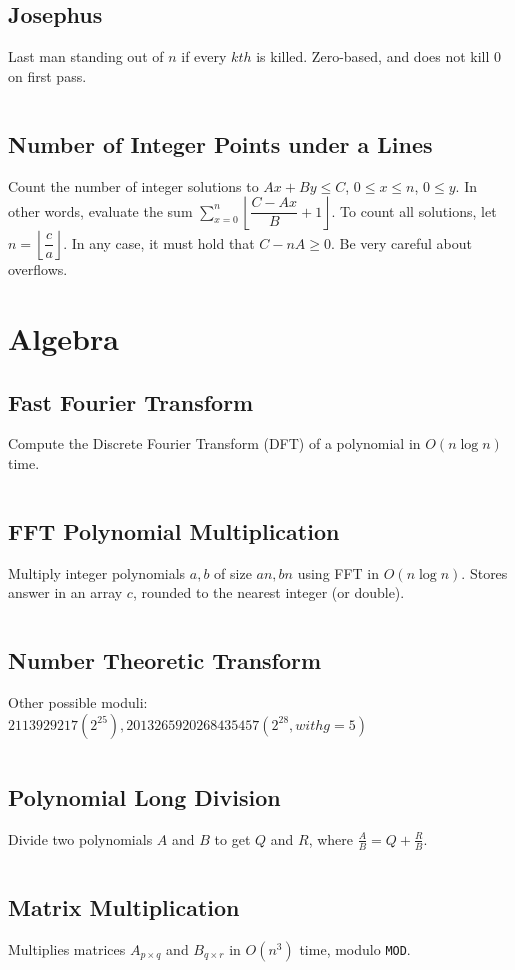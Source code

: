 \documentclass[8pt,a4paper,landscape,oneside]{amsart}
\newcommand{\code}[1]{\inputminted[fontsize=\normalsize,baselinestretch=1]{cpp}{_code/#1}}
\begin{document}
\begin{multicols*}{3}
  \subsection{Josephus}
    Last man standing out of $n$ if every $kth$ is killed. Zero-based, and does not kill $0$ on first pass.
    \code{numtheory/josephus.cpp}
  \subsection{Number of Integer Points under a Lines}
    Count the number of integer solutions to $Ax+By \leq C$, $0 \leq x \leq n$,
    $0 \leq y$. In other words, evaluate the sum $\sum_{x=0}^n\left\lfloor\dfrac{C-Ax}{B}+1\right\rfloor$.
    To count all solutions, let $n = \left\lfloor\dfrac{c}{a}\right\rfloor$.
    In any case, it must hold that $C-nA \geq 0$. Be very careful about overflows.
\section{Algebra}
  \subsection{Fast Fourier Transform}
    Compute the Discrete Fourier Transform (DFT) of a polynomial in $O(n \log n)$ time.
    \code{algebra/fft.cpp}
  \subsection{FFT Polynomial Multiplication}
    Multiply integer polynomials $a, b$ of size $an, bn$ using FFT in $O(n \log n)$. Stores answer in an array $c$, rounded to the nearest integer (or double).
    \code{algebra/fft-poly-mul.cpp}
  \subsection{Number Theoretic Transform}
    Other possible moduli: $2 113 929 217 (2^{25}), 2 013 265 920 268 435 457 (2^{28}, with g = 5)$
    \code{algebra/ntt.cpp}
  \subsection{Polynomial Long Division}
    Divide two polynomials $A$ and $B$ to get $Q$ and $R$, where $\frac{A}{B} = Q + \frac{R}{B}$.
    \code{algebra/poly-long-div.cpp}
  \subsection{Matrix Multiplication}
    Multiplies matrices $A_{p\times q}$ and $B_{q\times r}$ in $O(n^3)$ time, modulo \texttt{MOD}.
    \code{algebra/matmul.java}

\end{multicols*}
\end{document}
